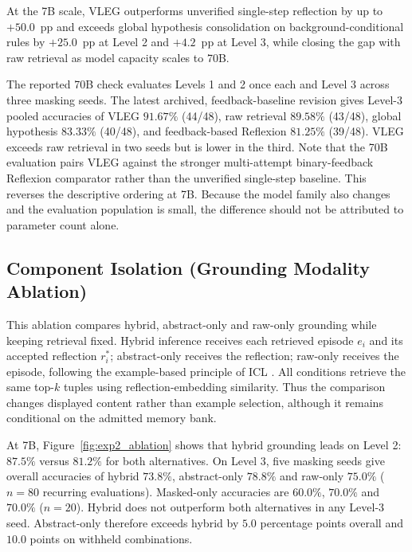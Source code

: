 \documentclass[journal]{IEEEtran}
\theoremstyle{definition}
\theoremstyle{remark}
\begin{document}
At the 7B scale, VLEG outperforms unverified single-step reflection by up to $+50.0$~pp and exceeds global hypothesis consolidation on background-conditional rules by $+25.0$~pp at Level 2 and $+4.2$~pp at Level 3, while closing the gap with raw retrieval as model capacity scales to 70B.

The reported 70B check evaluates Levels 1 and 2 once each and Level 3 across three masking seeds. The latest archived, feedback-baseline revision gives Level-3 pooled accuracies of VLEG $91.67\%$ (44/48), raw retrieval $89.58\%$ (43/48), global hypothesis $83.33\%$ (40/48), and feedback-based Reflexion $81.25\%$ (39/48). VLEG exceeds raw retrieval in two seeds but is lower in the third. Note that the 70B evaluation pairs VLEG against the stronger multi-attempt binary-feedback Reflexion comparator rather than the unverified single-step baseline. This reverses the descriptive ordering at 7B. Because the model family also changes and the evaluation population is small, the difference should not be attributed to parameter count alone.

\subsection{Component Isolation (Grounding Modality Ablation)}
\label{sec:exp2}

This ablation compares hybrid, abstract-only and raw-only grounding while keeping retrieval fixed. Hybrid inference receives each retrieved episode $e_i$ and its accepted reflection $r_i^*$; abstract-only receives the reflection; raw-only receives the episode, following the example-based principle of ICL \cite{brown2020language}. All conditions retrieve the same top-$k$ tuples using reflection-embedding similarity. Thus the comparison changes displayed content rather than example selection, although it remains conditional on the admitted memory bank.

At 7B, Figure~\ref{fig:exp2_ablation} shows that hybrid grounding leads on Level 2: $87.5\%$ versus $81.2\%$ for both alternatives. On Level 3, five masking seeds give overall accuracies of hybrid $73.8\%$, abstract-only $78.8\%$ and raw-only $75.0\%$ ($n=80$ recurring evaluations). Masked-only accuracies are $60.0\%$, $70.0\%$ and $70.0\%$ ($n=20$). Hybrid does not outperform both alternatives in any Level-3 seed. Abstract-only therefore exceeds hybrid by $5.0$ percentage points overall and $10.0$ points on withheld combinations.
\end{document}
